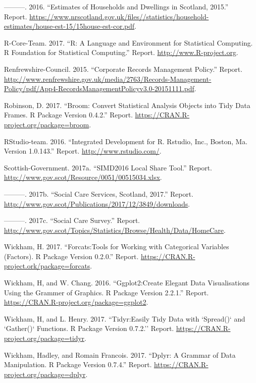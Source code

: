 \documentclass[]{article}
\begin{document}
\hypertarget{ref-RN493}{}
---------. 2016. ``Estimates of Households and Dwellings in Scotland,
2015.'' Report.
\url{https://www.nrscotland.gov.uk/files//statistics/household-estimates/house-est-15/15house-est-cor.pdf}.

\hypertarget{ref-RN295}{}
R-Core-Team. 2017. ``R: A Language and Environment for Statistical
Computing. R Foundation for Statistical Computing.'' Report.
\url{http://www.R-project.org}.

\hypertarget{ref-RN495}{}
Renfrewshire-Council. 2015. ``Corporate Records Management Policy.''
Report.
\url{http://www.renfrewshire.gov.uk/media/2763/Records-Management-Policy/pdf/App4-RecordsManagementPolicyv3.0-20151111.pdf}.

\hypertarget{ref-RN520}{}
Robinson, D. 2017. ``Broom: Convert Statistical Analysis Objects into
Tidy Data Frames. R Package Version 0.4.2.'' Report.
\url{https://CRAN.R-project.org/package=broom}.

\hypertarget{ref-RN498}{}
RStudio-team. 2016. ``Integrated Development for R. Rstudio, Inc.,
Boston, Ma. Version 1.0.143.'' Report.
\href{\%20http://www.rstudio.com/}{http://www.rstudio.com/}.

\hypertarget{ref-RN494}{}
Scottish-Government. 2017a. ``SIMD2016 Local Share Tool.'' Report.
\url{http://www.gov.scot/Resource/0051/00515034.xlsx}.

\hypertarget{ref-RN499}{}
---------. 2017b. ``Social Care Services, Scotland, 2017.'' Report.
\url{http://www.gov.scot/Publications/2017/12/3849/downloads}.

\hypertarget{ref-RN487}{}
---------. 2017c. ``Social Care Survey.'' Report.
\url{http://www.gov.scot/Topics/Statistics/Browse/Health/Data/HomeCare}.

\hypertarget{ref-RN521}{}
Wickham, H. 2017. ``Forcats:Tools for Working with Categorical Variables
(Factors). R Package Version 0.2.0.'' Report.
\url{https://CRAN.R-project.ork/package=forcats}.

\hypertarget{ref-RN525}{}
Wickham, H, and W. Chang. 2016. ``Ggplot2:Create Elegant Data
Visualisations Using the Grammer of Graphics. R Package Version 2.2.1.''
Report. \url{https://CRAN.R-project.org/package=ggplot2}.

\hypertarget{ref-RN524}{}
Wickham, H, and L. Henry. 2017. ``Tidyr:Easily Tidy Data with `Spread()`
and `Gather()` Functions. R Package Version 0.7.2.'' Report.
\url{https://CRAN.R-project.org/package=tidyr}.

\hypertarget{ref-RN283}{}
Wickham, Hadley, and Romain Francois. 2017. ``Dplyr: A Grammar of Data
Manipulation. R Package Version 0.7.4.'' Report.
\url{https://CRAN.R-project.org/package=dplyr}.
\end{document}
